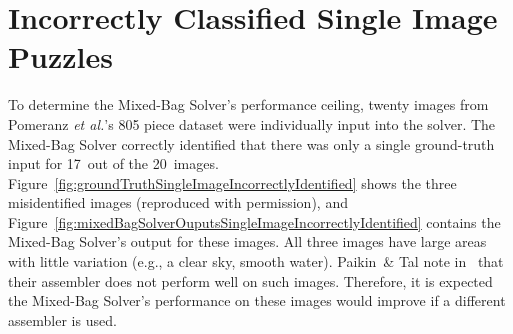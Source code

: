 \chapter{Incorrectly Classified Single Image Puzzles}\label{chap:incorreclyClassifiedSingleImages}

To determine the Mixed-Bag Solver's performance ceiling, twenty images from Pomeranz \textit{et al.}'s 805 piece dataset were individually input into the solver.  The Mixed-Bag Solver correctly identified that there was only a single ground-truth input for 17~out of the 20~images.  Figure~\ref{fig:groundTruthSingleImageIncorrectlyIdentified} shows the three misidentified images (reproduced with permission), and Figure~\ref{fig:mixedBagSolverOuputsSingleImageIncorrectlyIdentified} contains the Mixed-Bag Solver's output for these images.  All three images have large areas with little variation (e.g., a clear sky, smooth water).  Paikin~\& Tal note in~\cite{paikin2015} that their assembler does not perform well on such images.  Therefore, it is expected the Mixed-Bag Solver's performance on these images would improve if a different assembler is used.

